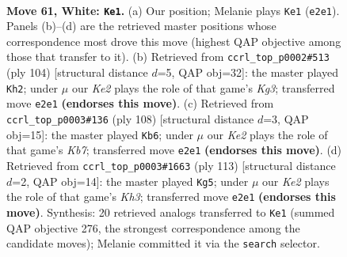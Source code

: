 \documentclass[11pt]{article}
\begin{document}
\clearpage

\begin{figure}[p]\centering
\begin{subfigure}{0.46\textwidth}\centering
\resizebox{\linewidth}{!}{%
\newchessgame
\chessboard[
  setfen={6k1/8/1P6/8/R3p1r1/8/4K3/8 w - - 1 61},
  showmover=false,
  pgfstyle=straightmove, color=movearrow, markmove={e2-e1}
]}
\caption{}
\end{subfigure}\hfill
\begin{subfigure}{0.46\textwidth}\centering
\resizebox{\linewidth}{!}{%
\newchessgame
\chessboard[
  setfen={8/4k3/8/3rp3/8/P5K1/4R3/8 w - - 2 53},
  showmover=false,
  pgfstyle=straightmove, color=movearrow, markmove={g3-h2}
]}
\caption{}
\end{subfigure}
\\[4pt]
\begin{subfigure}{0.46\textwidth}\centering
\resizebox{\linewidth}{!}{%
\newchessgame
\chessboard[
  setfen={8/1K6/3k3r/8/2P5/8/7p/7R w - - 4 55},
  showmover=false,
  pgfstyle=straightmove, color=movearrow, markmove={b7-b6}
]}
\caption{}
\end{subfigure}\hfill
\begin{subfigure}{0.46\textwidth}\centering
\resizebox{\linewidth}{!}{%
\newchessgame
\chessboard[
  setfen={8/2r5/2P4k/8/7p/8/2R2K2/8 b - - 0 57},
  showmover=false,
  pgfstyle=straightmove, color=movearrow, markmove={h6-g5}
]}
\caption{}
\end{subfigure}
\caption{\textbf{Move 61, White: \texttt{Ke1}.} (a) Our position; Melanie plays \texttt{Ke1} (\texttt{e2e1}). Panels (b)--(d) are the retrieved master positions whose correspondence most drove this move (highest QAP objective among those that transfer to it). (b) Retrieved from \texttt{ccrl\_top\_p0002\#513} (ply 104) [structural distance $d$=5, QAP obj=32]: the master played \texttt{Kh2}; under $\mu$ our \emph{Ke2} plays the role of that game's \emph{Kg3}; transferred move \texttt{e2e1} \textbf{(endorses this move)}. (c) Retrieved from \texttt{ccrl\_top\_p0003\#136} (ply 108) [structural distance $d$=3, QAP obj=15]: the master played \texttt{Kb6}; under $\mu$ our \emph{Ke2} plays the role of that game's \emph{Kb7}; transferred move \texttt{e2e1} \textbf{(endorses this move)}. (d) Retrieved from \texttt{ccrl\_top\_p0003\#1663} (ply 113) [structural distance $d$=2, QAP obj=14]: the master played \texttt{Kg5}; under $\mu$ our \emph{Ke2} plays the role of that game's \emph{Kh3}; transferred move \texttt{e2e1} \textbf{(endorses this move)}. Synthesis: 20 retrieved analogs transferred to \texttt{Ke1} (summed QAP objective 276, the strongest correspondence among the candidate moves); Melanie committed it via the \texttt{search} selector.}
\label{fig:thought-m120}
\end{figure}
\end{document}
